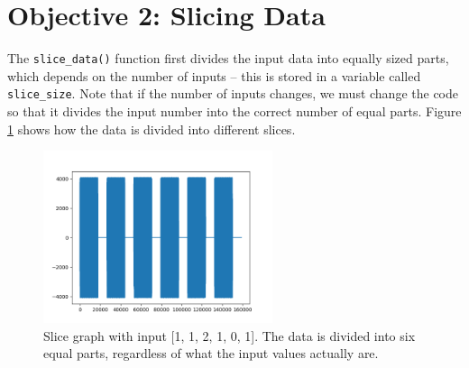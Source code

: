 \documentclass[12pt]{iopart}
\begin{document}
\section{Objective 2: Slicing Data}


The \verb|slice_data()| function first divides the input data into equally sized parts, which depends on the number of inputs -- this is stored in a variable called \verb|slice_size|.
Note that if the number of inputs changes, we must change the code so that it divides the input number into the correct number of equal parts.
Figure \ref{fig:slice_graph} shows how the data is divided into different slices.

\begin{figure}[h!tbp]
  \begin{center}
 \item[]\includegraphics[width=0.6\textwidth]{images/slice_graph.png}
  \caption{\label{fig:slice_graph}
  Slice graph with input [1, 1, 2, 1, 0, 1].
  The data is divided into six equal parts, regardless of what the input values actually are.
  }
  \end{center}
\end{figure}
\end{document}
